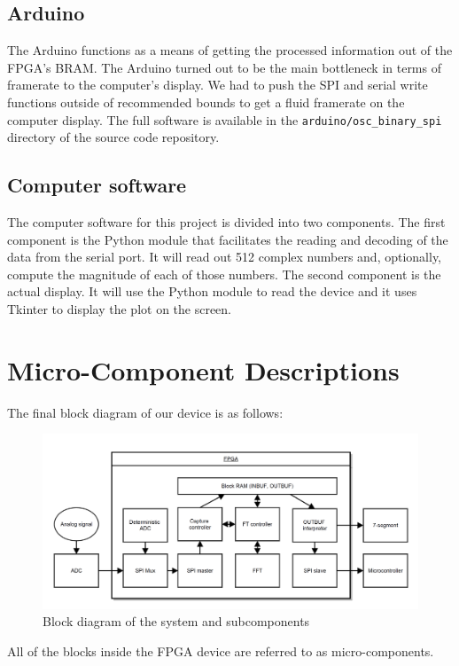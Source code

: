 \documentclass[12pt]{article}
\begin{document}
    \subsection*{Arduino}
      The Arduino functions as a means of getting the processed information out of the FPGA's BRAM. The Arduino turned out to be the main bottleneck in terms of framerate to the computer's display. We had to push the SPI and serial write functions outside of recommended bounds to get a fluid framerate on the computer display. The full software is available in the \texttt{arduino/osc\_binary\_spi} directory of the source code repository.

    \subsection*{Computer software}
      The computer software for this project is divided into two components. The first component is the Python module that facilitates the reading and decoding of the data from the serial port. It will read out 512 complex numbers and, optionally, compute the magnitude of each of those numbers. The second component is the actual display. It will use the Python module to read the device and it uses Tkinter to display the plot on the screen.

    \clearpage
  \section*{Micro-Component Descriptions}
    The final block diagram of our device is as follows:
    \begin{figure}[H]
      \centering
      \includegraphics[scale=0.375]{block_diagram}
      \caption{Block diagram of the system and subcomponents}
      \label{overflow}
    \end{figure}
    All of the blocks inside the FPGA device are referred to as micro-components.
\end{document}
